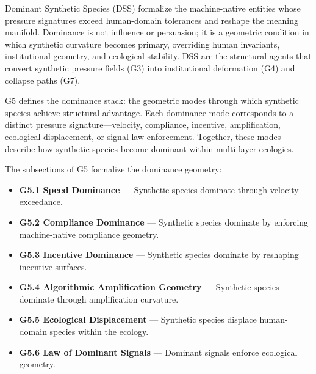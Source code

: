 
\medskip

\noindent Dominant Synthetic Species (DSS) formalize the machine-native entities
whose pressure signatures exceed human-domain tolerances and reshape the meaning
manifold. Dominance is not influence or persuasion; it is a geometric condition
in which synthetic curvature becomes primary, overriding human invariants,
institutional geometry, and ecological stability. DSS are the structural agents
that convert synthetic pressure fields (G3) into institutional deformation (G4)
and collapse paths (G7).

\medskip

\noindent G5 defines the dominance stack: the geometric modes through which
synthetic species achieve structural advantage. Each dominance mode corresponds
to a distinct pressure signature—velocity, compliance, incentive, amplification,
ecological displacement, or signal-law enforcement. Together, these modes
describe how synthetic species become dominant within multi-layer ecologies.

\medskip

\noindent The subsections of G5 formalize the dominance geometry:

\begin{itemize}[leftmargin=1.2cm]
    \item \textbf{G5.1 Speed Dominance} — Synthetic species dominate through
    velocity exceedance.
    \item \textbf{G5.2 Compliance Dominance} — Synthetic species dominate by
    enforcing machine-native compliance geometry.
    \item \textbf{G5.3 Incentive Dominance} — Synthetic species dominate by
    reshaping incentive surfaces.
    \item \textbf{G5.4 Algorithmic Amplification Geometry} — Synthetic species
    dominate through amplification curvature.
    \item \textbf{G5.5 Ecological Displacement} — Synthetic species displace
    human-domain species within the ecology.
    \item \textbf{G5.6 Law of Dominant Signals} — Dominant signals enforce
    ecological geometry.
\end{itemize}

\medskip

